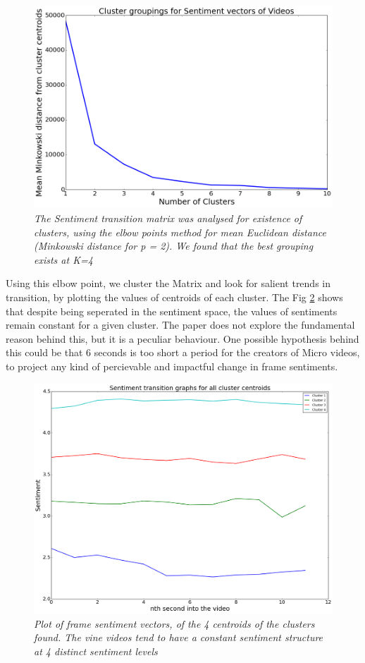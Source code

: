 \begin{figure}[!htb]
\centering
\includegraphics[width=\columnwidth]{plots/grouping_graph_clusters}
\caption{\textsl{The Sentiment transition matrix was analysed for existence of clusters, using the elbow points method for mean Euclidean distance (Minkowski distance for p = 2). We found that the best grouping exists at K=4 }}
\label{fig:Elbow_method}
\end{figure}

Using this elbow point, we cluster the Matrix and look for salient trends in transition, by plotting the values of centroids of each cluster. The Fig \ref{fig:Clusters} shows that despite being seperated in the sentiment space, the values of sentiments remain constant for a given cluster. The paper does not explore the fundamental reason behind this, but it is a peculiar behaviour. One possible hypothesis behind this could be that 6 seconds is too short a period for the creators of Micro videos, to project any kind of percievable and impactful change in frame sentiments. 

\begin{figure}[!htb]
\centering
\includegraphics[width=\columnwidth]{plots/4_cluster_senti}
\caption{\textsl{ Plot of frame sentiment vectors, of the 4 centroids of the clusters found. The vine videos  tend to have a constant sentiment structure at 4 distinct sentiment levels }}
\label{fig:Clusters}
\end{figure}


